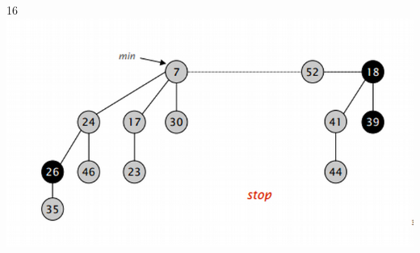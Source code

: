 \documentclass{beamer}
\begin{document}
\begin{frame}
\begin{columns}[t]
    16
    \includegraphics[width =1 \textwidth]{imagenes/delete16.png}

   \end{columns}
  \end{frame}
\end{document}
